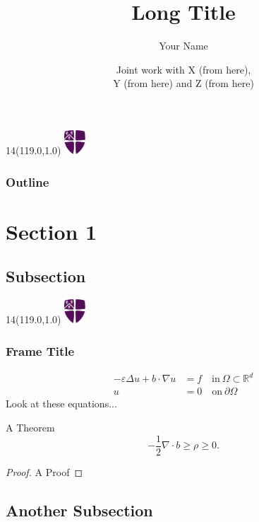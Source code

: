 \documentclass[xcolor=dvipsnames,usepdftitle=false]{beamer}
\title[Short Title]{Long Title}
\author{Your Name}
\institute[Durham]{}
\date[29 July 2010]{Joint work with X (from here),\\Y (from here) and Z (from here)}
\institute[Durham]{\includegraphics[height=1.5cm]{pictures/logo_purple.eps}}
\newcommand{\MyLogo}{%
	\begin{textblock}{14}(119.0,1.0) %
		\includegraphics[width=0.8cm]{pictures/logo_only.eps}
	\end{textblock}
}
\renewcommand\epsilon{\varepsilon}
\newcommand{\pO}{{\partial \Omega}}
\newcommand{\half}[0]{\ensuremath{\frac{1}{2}}}
\begin{document}
\frame[plain]{\titlepage}

\begin{frame}
	\MyLogo
	\frametitle{Outline}
	\tableofcontents
\end{frame}

\section{Section 1}

\subsection*{Subsection} %

\begin{frame}
	\MyLogo
	\frametitle{Frame Title}
	\begin{equation} 
		\begin{split}
		-\epsilon \Delta u + b \cdot \nabla u & = f  \quad \mathrm{in}~ \Omega \subset \mathbb{R}^d  \nonumber\\
		u & = 0   \quad \mathrm{on}~ \pO \nonumber
		\end{split}
	\end{equation}
	Look at these equations...

	\begin{theorem}
		A Theorem
		\begin{equation}
			- \half \nabla \cdot b \ge \rho \ge 0. \nonumber
		\end{equation}
	\end{theorem}
	\begin{proof}
		A Proof
	\end{proof}

\end{frame}

\subsection*{Another Subsection}
\end{document}
